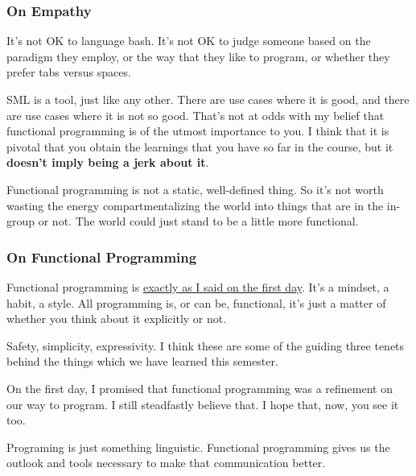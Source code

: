 \documentclass[aspectratio=169, handout]{beamer}
\begin{document}
\begin{frame}[fragile]
  \frametitle{On Empathy}

  It's not OK to language bash. It's not OK to judge someone based on the
  paradigm they employ, or the way that they like to program, or whether
  they prefer tabs versus spaces.

  \pause
  \vspace{\fill}

  SML is a tool, just like any other. There are use cases where it is good,
  and there are use cases where it is not so good. That's not at odds with
  my belief that functional programming is of the utmost importance to you.
  I think that it is pivotal that you obtain the learnings that you have so
  far in the course, but it \textbf{doesn't imply being a jerk about it}.

  \pause
  \vspace{\fill}

  Functional programming is not a static, well-defined thing. So
  it's not worth wasting the energy compartmentalizing the world into things
  that are in the in-group or not. The world could just stand to be a little
  more functional.

\end{frame}

\begin{frame}[fragile]
  \frametitle{On Functional Programming}

  Functional programming is
  {\color{blue}\href{https://tvtropes.org/pmwiki/pmwiki.php/Main/ExactlyWhatItSaysOnTheTin}{exactly
  as I said on the first day}}. It's a mindset, a habit, a style. All
  programming is, or can be, functional, it's just a matter of whether you think
  about it explicitly or not.

  \pause
  \vspace{\fill}

  Safety, simplicity, expressivity. I think these are some of the guiding three
  tenets behind the things which we have learned this semester.

  \pause
  \vspace{\fill}

  On the first day, I promised that functional programming was a refinement on
  our way to program. I still steadfastly believe that. I hope that, now, you
  see it too.

  \pause
  \vspace{\fill}

  Programing is just something linguistic. Functional programming gives us the
  outlook and tools necessary to make that communication better.
\end{frame}
\end{document}
